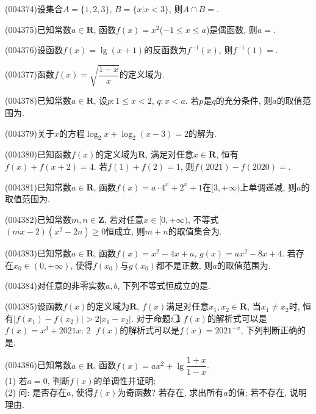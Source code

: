 \item (004374)设集合$A=\{1,2,3\}$, $B=\{x|x<3\}$, 则$A\cap B=$.
\item (004375)已知常数$a\in \mathbf{R}$, 函数$f(x)=x^2$($-1\le x\le a$)是偶函数, 则$a=$.
\item (004376)设函数$f(x)=\lg (x+1)$的反函数为$f^{-1}(x)$, 则$f^{-1}(1)=$.
\item (004377)函数$f(x)=\sqrt{\dfrac{1-x}x}$的定义域为.
\item (004378)已知常数$a\in \mathbf{R}$, 设$p:1\le x<2$, $q:x<a$. 若$p$是$q$的充分条件, 则$a$的取值范围为.
\item (004379)关于$x$的方程$\log_2 x+\log_2(x-3)=2$的解为.
\item (004380)已知函数$f(x)$的定义域为$\mathbf{R}$, 满足对任意$x\in \mathbf{R}$, 恒有$f(x)+f(x+2)=4$. 若$f(1)+f(2)=1$, 则$f(2021)-f(2020)=$.
\item (004381)已知常数$a\in \mathbf{R}$, 函数$f(x)=a\cdot 4^x+2^x+1$在$[3,+\infty)$上单调递减, 则$a$的取值范围为.
\item (004382)已知常数$m,n\in \mathbf{Z}$, 若对任意$x\in [0,+\infty)$, 不等式$(mx-2)(x^2-2n)\ge 0$恒成立, 则$m+n$的取值集合为.
\item (004383)已知常数$a\in \mathbf{R}$, 函数$f(x)=x^2-4x+a$, $g(x)=ax^2-8x+4$. 若存在$x_0\in (0,+\infty)$, 使得$f(x_0)$与$g(x_0)$都不是正数, 则$a$的取值范围为.
\item (004384)对任意的非零实数$a,b$, 下列不等式恒成立的是.
\item (004385)设函数$f(x)$的定义域为$\mathbf{R}$, $f(x)$满足对任意$x_1,x_2\in \mathbf{R}$, 当$x_1\ne x_2$时, 恒有$|f(x_1)-f(x_2)|>2|x_1-x_2|$. 对于命题: \textcircled{1} $f(x)$的解析式可以是$f(x)=x^3+2021x$; \textcircled{2} $f(x)$的解析式可以是$f(x)=2021^{-x}$, 下列判断正确的是.
\item (004386)已知常数$a\in \mathbf{R}$, 函数$f(x)=ax^2+\lg \dfrac{1+x}{1-x}$.\\
(1) 若$a=0$, 判断$f(x)$的单调性并证明;\\
(2) 问: 是否存在$a$, 使得$f(x)$为奇函数? 若存在, 求出所有$a$的值; 若不存在, 说明理由.
